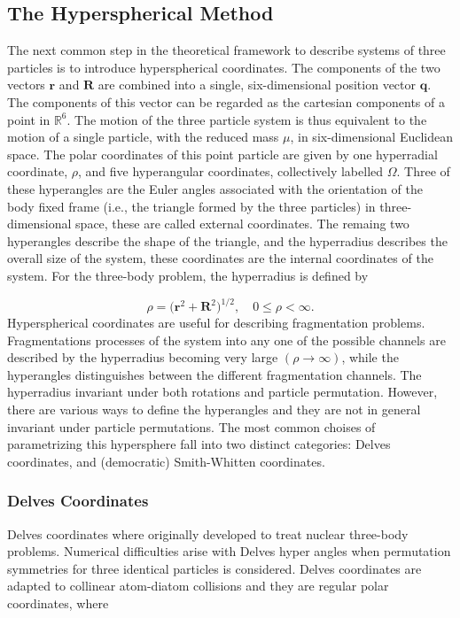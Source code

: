 \documentclass{article}
\begin{document}
\subsection{The Hyperspherical Method}
The next common step in the theoretical framework to describe systems of three particles is to introduce hyperspherical coordinates. The components of the two vectors $\mathbf{r}$ and $\mathbf{R}$ are combined into a single, six-dimensional position vector $\mathbf{q}$. The components of this vector can be regarded as the cartesian components of a point in $\mathbb{R}^{6}$. The motion of the three particle system is thus equivalent to the motion of a single particle, with the reduced mass $\mu$, in six-dimensional Euclidean space. The polar coordinates of this point particle are given by one hyperradial coordinate, $\rho$, and five hyperangular coordinates, collectively labelled $\Omega$. Three of these hyperangles are the Euler angles associated with the orientation of the body fixed frame (i.e., the triangle formed by the three particles) in three-dimensional space, these are called external coordinates. The remaing two hyperangles describe the shape of the triangle, and the hyperradius describes the overall size of the system, these coordinates are the internal coordinates of the system. For the three-body problem, the hyperradius is defined by

\begin{equation}
\rho = \Big(\mathbf{r}^{2} + \mathbf{R}^{2}\Big)^{1/2}, \quad 0\leq \rho < \infty.
\end{equation} 
Hyperspherical coordinates are useful for describing fragmentation problems. Fragmentations processes of the system into any one of the possible channels are described by the hyperradius becoming very large $(\rho \rightarrow \infty)$, while the hyperangles distinguishes between the different fragmentation channels. The hyperradius invariant under both rotations and particle permutation. However, there are various ways to define the hyperangles and they are not in general invariant under particle permutations. The most common choises of parametrizing this hypersphere fall into two distinct categories: Delves coordinates, and (democratic) Smith-Whitten coordinates. 

\subsubsection{Delves Coordinates}
Delves coordinates where originally developed to treat nuclear three-body problems. Numerical difficulties arise with Delves hyper angles when permutation symmetries for three identical particles is considered. Delves coordinates are adapted to collinear atom-diatom collisions and they are regular polar coordinates, where
\end{document}
